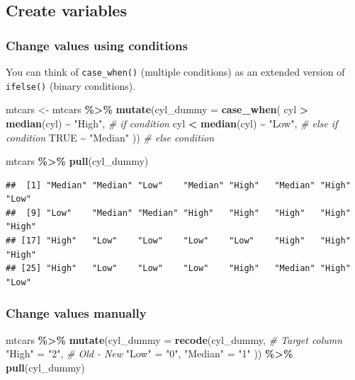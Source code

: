 \documentclass[
]{book}
\newenvironment{Shaded}{\begin{snugshade}}{\end{snugshade}}
\newcommand{\AttributeTok}[1]{\textcolor[rgb]{0.13,0.29,0.53}{#1}}
\newcommand{\CommentTok}[1]{\textcolor[rgb]{0.56,0.35,0.01}{\textit{#1}}}
\newcommand{\ConstantTok}[1]{\textcolor[rgb]{0.56,0.35,0.01}{#1}}
\newcommand{\FunctionTok}[1]{\textcolor[rgb]{0.13,0.29,0.53}{\textbf{#1}}}
\newcommand{\NormalTok}[1]{#1}
\newcommand{\OtherTok}[1]{\textcolor[rgb]{0.56,0.35,0.01}{#1}}
\newcommand{\SpecialCharTok}[1]{\textcolor[rgb]{0.81,0.36,0.00}{\textbf{#1}}}
\newcommand{\StringTok}[1]{\textcolor[rgb]{0.31,0.60,0.02}{#1}}
\begin{document}
\subsection{Create variables}\label{create-variables}

\subsubsection{Change values using conditions}\label{change-values-using-conditions}

You can think of \texttt{case\_when()} (multiple conditions) as an extended version of \texttt{ifelse()} (binary conditions).

\begin{Shaded}
\begin{Highlighting}[]
\NormalTok{mtcars }\OtherTok{\textless{}{-}}\NormalTok{ mtcars }\SpecialCharTok{\%\textgreater{}\%}
  \FunctionTok{mutate}\NormalTok{(}\AttributeTok{cyl\_dummy =} \FunctionTok{case\_when}\NormalTok{(}
\NormalTok{    cyl }\SpecialCharTok{\textgreater{}} \FunctionTok{median}\NormalTok{(cyl) }\SpecialCharTok{\textasciitilde{}} \StringTok{"High"}\NormalTok{, }\CommentTok{\# if condition}
\NormalTok{    cyl }\SpecialCharTok{\textless{}} \FunctionTok{median}\NormalTok{(cyl) }\SpecialCharTok{\textasciitilde{}} \StringTok{"Low"}\NormalTok{, }\CommentTok{\# else if condition}
    \ConstantTok{TRUE} \SpecialCharTok{\textasciitilde{}} \StringTok{"Median"}
\NormalTok{  )) }\CommentTok{\# else condition}

\NormalTok{mtcars }\SpecialCharTok{\%\textgreater{}\%} \FunctionTok{pull}\NormalTok{(cyl\_dummy)}
\end{Highlighting}
\end{Shaded}

\begin{verbatim}
##  [1] "Median" "Median" "Low"    "Median" "High"   "Median" "High"   "Low"   
##  [9] "Low"    "Median" "Median" "High"   "High"   "High"   "High"   "High"  
## [17] "High"   "Low"    "Low"    "Low"    "Low"    "High"   "High"   "High"  
## [25] "High"   "Low"    "Low"    "Low"    "High"   "Median" "High"   "Low"
\end{verbatim}

\subsubsection{Change values manually}\label{change-values-manually}

\begin{Shaded}
\begin{Highlighting}[]
\NormalTok{mtcars }\SpecialCharTok{\%\textgreater{}\%}
  \FunctionTok{mutate}\NormalTok{(}\AttributeTok{cyl\_dummy =} \FunctionTok{recode}\NormalTok{(cyl\_dummy, }\CommentTok{\# Target column}
    \StringTok{"High"} \OtherTok{=} \StringTok{"2"}\NormalTok{, }\CommentTok{\# Old {-} New}
    \StringTok{"Low"} \OtherTok{=} \StringTok{"0"}\NormalTok{,}
    \StringTok{"Median"} \OtherTok{=} \StringTok{"1"}
\NormalTok{  )) }\SpecialCharTok{\%\textgreater{}\%}
  \FunctionTok{pull}\NormalTok{(cyl\_dummy)}
\end{Highlighting}
\end{Shaded}
\end{document}
